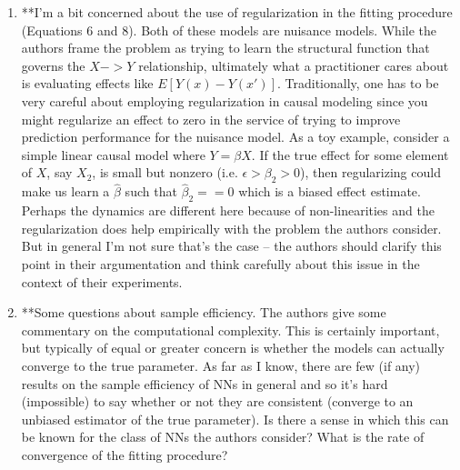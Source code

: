 \documentclass{article}
\begin{document}
\begin{enumerate}
\item **I'm a bit concerned about the use of regularization in the fitting procedure (Equations 6 and 8). Both of these models are nuisance models. While the authors frame the problem as trying to learn the structural function that governs the $X->Y$ relationship, ultimately what a practitioner cares about is evaluating effects like $E[Y(x) - Y(x')]$. Traditionally, one has to be very careful about employing regularization in causal modeling since you might regularize an effect to zero in the service of trying to improve prediction performance for the nuisance model. As a toy example, consider a simple linear causal model where $Y = \beta X$. If the true effect for some element of $X$, say $X_2$, is small but nonzero (i.e. $\epsilon > \beta_2 > 0$), then regularizing could make us learn a $\hat{\beta}$ such that $\hat{\beta}_2 == 0$ which is a biased effect estimate. Perhaps the dynamics are different here because of non-linearities and the regularization does help empirically with the problem the authors consider. But in general I'm not sure that's the case -- the authors should clarify this point in their argumentation and think carefully about this issue in the context of their experiments.


\item **Some questions about sample efficiency. The authors give some commentary on the computational complexity. This is certainly important, but typically of equal or greater concern is whether the models can actually converge to the true parameter. As far as I know, there are few (if any) results on the sample efficiency of NNs in general and so it's hard (impossible) to say whether or not they are consistent (converge to an unbiased estimator of the true parameter). Is there a sense in which this can be known for the class of NNs the authors consider? What is the rate of convergence of the fitting procedure?


\end{enumerate}
\end{document}
